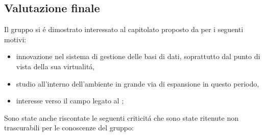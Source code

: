 \subsection{Valutazione finale}
Il gruppo si \'e dimostrato interessato al capitolato proposto da \Proponente{} per i seguenti motivi:
\begin{itemize}
	\item innovazione nel sistema di gestione delle basi di dati, soprattutto dal punto di vista della sua virtualit\'a,
	\item studio all'interno dell'ambiente  in grande via di espansione in questo periodo,
	\item interesse verso il campo legato al ;
\end{itemize}
Sono state anche riscontate le seguenti criticit\'a che sono state ritenute non trascurabili per le conoscenze del gruppo:
\begin{itemize}
	
\end{itemize}